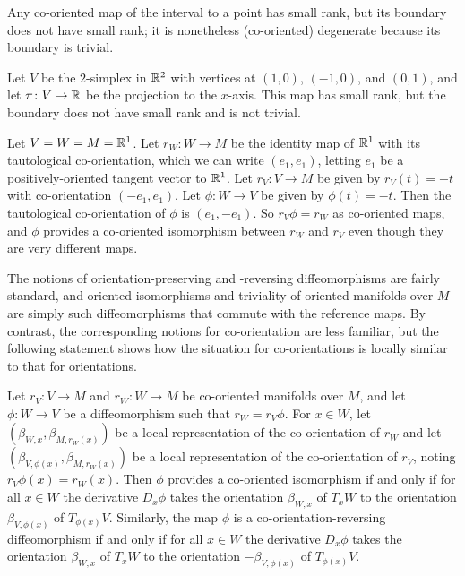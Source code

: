 \begin{example}
	Any co-oriented map of the interval to a point has small rank, but its boundary does not have small rank; it is nonetheless (co-oriented) degenerate because its boundary is trivial.
\end{example}

\begin{example}\label{E: projected triangle}
	Let $V$ be the $2$-simplex in $\mathbb{R}^2$ with vertices at $(1,0)$, $(-1,0)$, and $(0,1)$, and let $\pi \colon V \to \mathbb{R}$ be the projection to the $x$-axis.
	This map has small rank, but the boundary does not have small rank and is not trivial.
\end{example}

\begin{example}
	Let $V = W = M = \mathbb{R}^1$.
	Let $r_W \colon W \to M$ be the identity map of $\mathbb{R}^1$ with its tautological co-orientation, which we can write $(e_1,e_1)$, letting $e_1$ be a positively-oriented tangent vector to $\mathbb{R}^1$.
	Let $r_V \colon V \to M$ be given by $r_V(t) = -t$ with co-orientation $(-e_1,e_1)$.
	Let $\phi \colon W \to V$ be given by $\phi(t) = -t$.
	Then the tautological co-orientation of $\phi$ is $(e_1,-e_1)$.
	So $r_V\phi = r_W$ as co-oriented maps, and $\phi$ provides a co-oriented isomorphism between $r_W$ and $r_V$ even though they are very different maps.
\end{example}

The notions of orientation-preserving and -reversing diffeomorphisms are fairly standard, and oriented isomorphisms and triviality of oriented manifolds over $M$ are simply such diffeomorphisms that commute with the reference maps.
By contrast, the corresponding notions for co-orientation are less familiar, but the following statement shows how the situation for co-orientations is locally similar to that for orientations.

\begin{lemma}\label{L: co-or preserving/reversing}
	Let $r_V \colon V \to M$ and $r_W \colon W \to M$ be co-oriented manifolds over $M$, and let $\phi \colon W \to V$ be a diffeomorphism such that $r_W = r_V \phi$.
	For $x \in W$, let $(\beta_{W,x},\beta_{M,r_W(x)})$ be a local representation of the co-orientation of $r_W$ and let $(\beta_{V, \phi(x)},\beta_{M,r_W(x)})$ be a local representation of the co-orientation of $r_V$, noting $r_V\phi(x)=r_W(x)$.
	Then $\phi$ provides a co-oriented isomorphism if and only if for all $x\in W$ the derivative $D_x\phi$ takes the orientation $\beta_{W,x}$ of $T_xW$ to the orientation $\beta_{V, \phi(x)}$ of $T_{\phi(x)}V$.
	Similarly, the map $\phi$ is a co-orientation-reversing diffeomorphism if and only if for all $x\in W$ the derivative $D_x\phi$ takes the orientation $\beta_{W,x}$ of $T_xW$ to the orientation $-\beta_{V, \phi(x)}$ of $T_{\phi(x)}V$.
\end{lemma}

